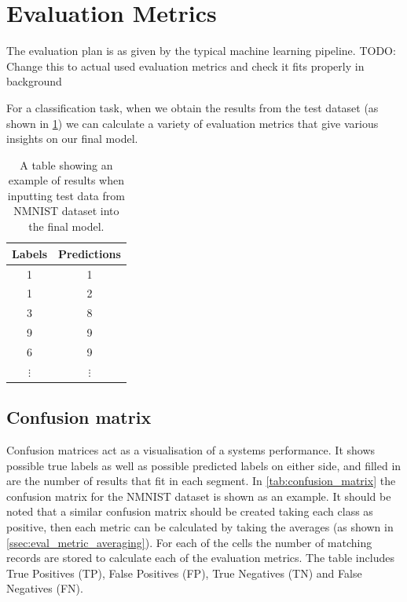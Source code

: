 \section{Evaluation Metrics} \label{sec:evalutaion_metrics}

The evaluation plan is as given by the typical machine learning pipeline\cite{IntroToML}. \color{red} TODO: Change this to actual used evaluation metrics and check it fits properly in background \color{black}

For a classification task, when we obtain the results from the test dataset (as shown in \cref{tab:possible_results}) we can calculate a variety of evaluation metrics that give various insights on our final model.

\begin{table}[htb]
    \centering
    \begin{tabular}{|| c  | c ||}
        \hline
        Labels     & Predictions \\
        \hline \hline
        1          & 1           \\
        \hline
        1          & 2           \\
        \hline
        3          & 8           \\
        \hline
        9          & 9           \\
        \hline
        6          & 9           \\
        \hline
        $ \vdots $ & $ \vdots $  \\
    \end{tabular}
    \caption{A table showing an example of results when inputting test data from NMNIST dataset\cite{NMNIST} into the final model.}
    \label{tab:possible_results}
\end{table}

\subsection{Confusion matrix}

Confusion matrices act as a visualisation of a systems performance. It shows possible true labels as well as possible predicted labels on either side, and filled in are the number of results that fit in each segment. In \cref{tab:confusion_matrix} the confusion matrix for the NMNIST dataset is shown as an example. It should be noted that a similar confusion matrix should be created taking each class as positive, then each metric can be calculated by taking the averages (as shown in \cref{ssec:eval_metric_averaging}). For each of the cells the number of matching records are stored to calculate each of the evaluation metrics. The table includes True Positives (TP), False Positives (FP), True Negatives (TN) and False Negatives (FN).

